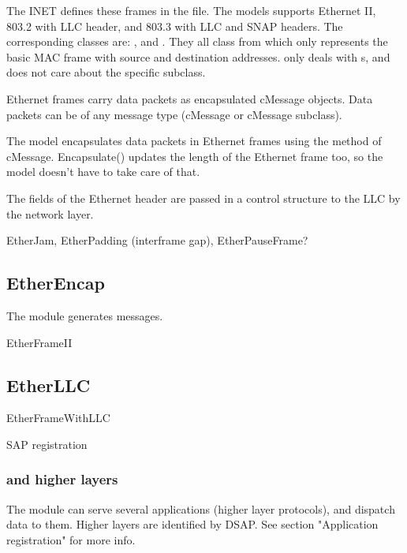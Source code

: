 The INET defines these frames in the  file.
The models supports Ethernet II, 803.2 with LLC header, and 803.3 with LLC and SNAP headers.
The corresponding classes are:
,  and . They all class
from  which only represents the basic MAC frame with source and
destination addresses.  only deals with s, and does not
care about the specific subclass.

Ethernet frames carry data packets as encapsulated cMessage objects.
Data packets can be of any message type (cMessage or cMessage subclass).

The model encapsulates data packets in Ethernet frames using the 
method of cMessage. Encapsulate() updates the length of the Ethernet frame too,
so the model doesn't have to take care of that.

The fields of the Ethernet header are passed in a 
control structure to the LLC by the network layer.


EtherJam, EtherPadding (interframe gap), EtherPauseFrame?


\subsection{EtherEncap}

The  module generates  messages.

EtherFrameII

\subsection{EtherLLC}

EtherFrameWithLLC

SAP registration


\subsubsection{ and higher layers}

The  module can serve several applications (higher layer protocols),
and dispatch data to them. Higher layers are identified by DSAP.
See section "Application registration" for more info.


